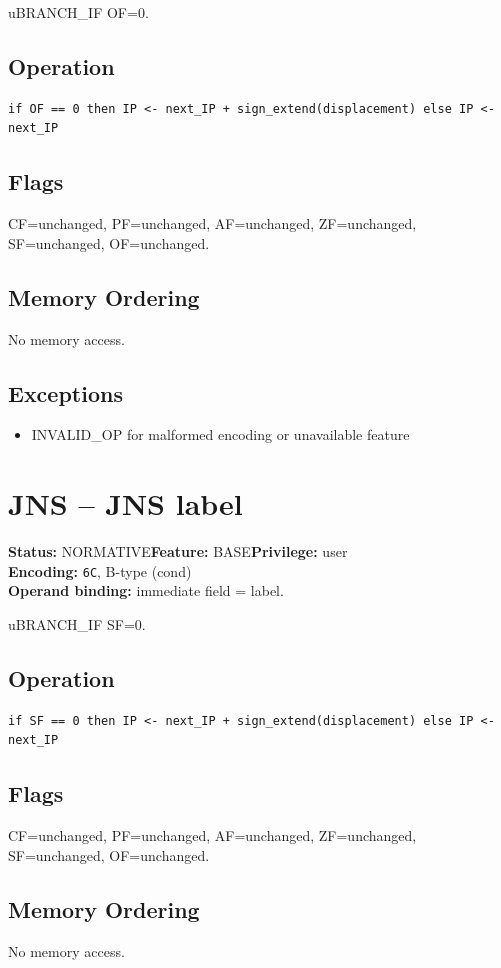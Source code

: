 \documentclass[10pt]{article}
\begin{document}
uBRANCH\_IF OF=0.

\subsection*{Operation}
\begin{lstlisting}
if OF == 0 then IP <- next_IP + sign_extend(displacement) else IP <- next_IP
\end{lstlisting}
\subsection*{Flags}
CF=unchanged, PF=unchanged, AF=unchanged, ZF=unchanged, SF=unchanged, OF=unchanged.
\subsection*{Memory Ordering}
No memory access.
\subsection*{Exceptions}
\begin{itemize}
\item INVALID\_OP for malformed encoding or unavailable feature
\end{itemize}
\clearpage

\section{JNS -- JNS label}
\textbf{Status:} NORMATIVE\quad \textbf{Feature:} BASE\quad \textbf{Privilege:} user\\
\textbf{Encoding:} \texttt{6C}, B-type (cond)\\
\textbf{Operand binding:} immediate field = label.

uBRANCH\_IF SF=0.

\subsection*{Operation}
\begin{lstlisting}
if SF == 0 then IP <- next_IP + sign_extend(displacement) else IP <- next_IP
\end{lstlisting}
\subsection*{Flags}
CF=unchanged, PF=unchanged, AF=unchanged, ZF=unchanged, SF=unchanged, OF=unchanged.
\subsection*{Memory Ordering}
No memory access.
\end{document}
